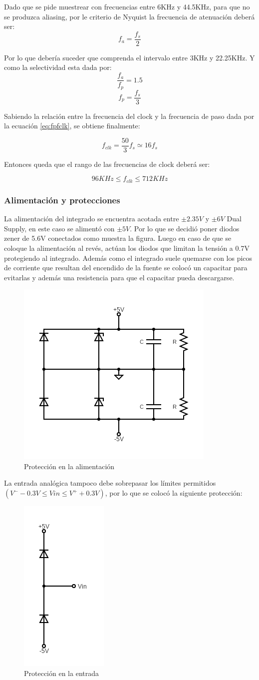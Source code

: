 \documentclass[assd_tp3_main.tex]{subfiles}
\begin{document}
Dado que se pide muestrear con frecuencias entre 6KHz y 44.5KHz, para que no se
produzca aliasing, por le criterio de Nyquist la frecuencia de atenuación deberá ser:
$$ f_{a} = \frac{f_s}{2}$$

Por lo que debería suceder que comprenda el intervalo entre 3KHz y 22.25KHz.
Y como la selectividad esta dada por:
$$\frac{f_a}{f_p}=1.5$$
$$f_p = \frac{f_s}{3}$$


Sabiendo la relación entre la frecuencia del clock y la frecuencia de paso dada por la
ecuación \ref{eq:fpfclk}, se obtiene finalmente:

$$ f_{clk} = \frac{50}{3}f_s \simeq 16f_s$$

Entonces queda que el rango de las frecuencias de clock deberá ser: 

$$ 96KHz \leq f_{clk} \leq 712KHz $$

\subsubsection{Alimentación y protecciones}
La alimentación del integrado se encuentra acotada entre $\pm 2.35V$ y $\pm6V$ Dual Supply,
en este caso se alimentó con $\pm5V$. Por lo que se decidió poner diodos zener de 5.6V
conectados como muestra la figura. Luego en caso de que se coloque la alimentación
al revés, actúan los diodos que limitan la tensión a 0.7V protegiendo al integrado.
Además como el integrado suele quemarse con los picos de corriente que resultan del
encendido de la fuente se colocó un capacitar para evitarlas y además una resistencia
para que el capacitar pueda descargarse. 

\begin{figure}[H]
	\centering
	\includegraphics[width=0.4 \textwidth]
	{images/ej1/proteccionalim.png}
	\caption{Protección en la alimentación}
	\label{fig:pal}
\end{figure}

La entrada analógica tampoco debe sobrepasar los límites permitidos
$(V^- - 0.3V \leq Vin \leq V^+ + 0.3V )$, por lo que se colocó la siguiente protección:

\begin{figure}[H]
	\centering
	\includegraphics[width=0.2 \textwidth]
	{images/ej1/proteccionin.png}
	\caption{Protección en la entrada}
	\label{fig:pin}
\end{figure}
\end{document}
